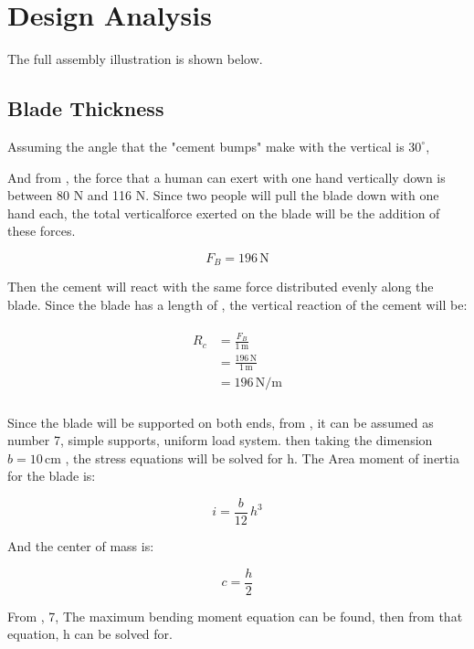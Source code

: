 \documentclass[11pt]{article}
\begin{document}
\section{Design Analysis}

The full assembly illustration is shown below.

\subsection{Blade Thickness}

Assuming the angle that the "cement bumps" make with the vertical is $30^\circ$,

And from \cite[Figure 9.10]{shigley}, the force that a human can exert with one hand vertically down is between 80 N and 116 N. Since two people will pull the blade down with one hand each, the total verticalforce exerted on the blade will be the addition of these forces.

\begin{equation}
F_{B}	= 196\,\mathrm{N}
\end{equation}

Then the cement will react with the same force distributed evenly along the blade. Since the blade has a length of  , the vertical reaction of the cement will be:

\begin{align}
\begin{split}
R_{c}	&= \frac{F_{B}}{1\,\mathrm{m}}\\
		&= \frac{196\,\mathrm{N}}{1\,\mathrm{m}}\\
		&= 196\,\mathrm{{N}\slash{m}}\\
\end{split}
\end{align}

Since the blade will be supported on both ends, from \cite[Table A-9]{shigley}, it can be assumed as number 7, simple supports, uniform load system. then taking the dimension 
 $b = 10\,\mathrm{cm}$ , the stress equations will be solved for h. The Area moment of inertia for the blade is:

\begin{equation}
i=\frac{b}{12} \, h^{3}
\end{equation}

And the center of mass is:

\begin{equation}
c=\frac{h}{2}
\end{equation}

From \cite[Table A-9]{shigley}, 7, The maximum bending moment equation can be found, then from that equation, h can be solved for.
\end{document}
